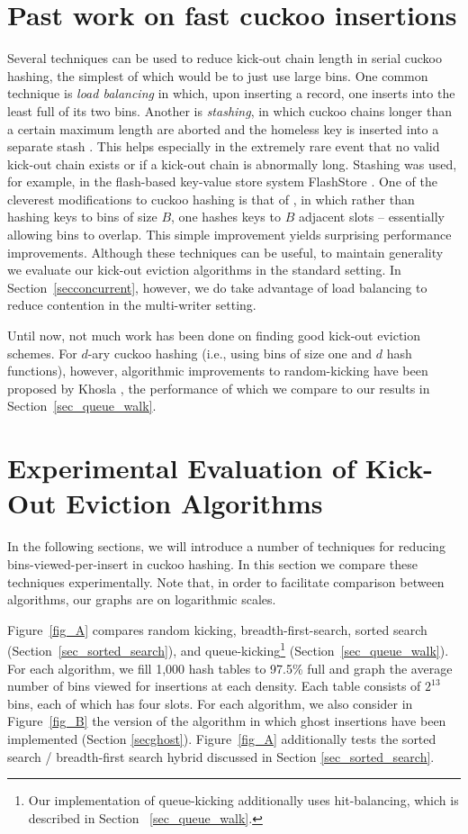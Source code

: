 \documentclass{sig-alternate-05-2015}
\begin{document}
\section{Past work on fast cuckoo insertions} \label{sec_past_work}

Several techniques can be used to reduce kick-out chain length in
serial cuckoo hashing, the simplest of which would be to just use
large bins. One common technique is \emph{load balancing} in which,
upon inserting a record, one inserts into the least full of its two
bins. Another is \emph{stashing}, in which cuckoo chains longer than a
certain maximum length are aborted and the homeless key is inserted
into a separate stash \cite{kirsch09}. This helps especially in the
extremely rare event that no valid kick-out chain exists or if a
kick-out chain is abnormally long. Stashing was used, for example, in
the flash-based key-value store system FlashStore \cite{flash10}. One
of the cleverest modifications to cuckoo hashing is that of
\cite{lehman09}, in which rather than hashing keys to bins of size
$B$, one hashes keys to $B$ adjacent slots -- essentially allowing
bins to overlap. This simple improvement yields surprising performance
improvements. Although these techniques can be useful, to maintain
generality we evaluate our kick-out eviction algorithms in the
standard setting. In Section~\ref{secconcurrent}, however, we do take
advantage of load balancing to reduce contention in the multi-writer
setting.


Until now, not much work has been done on finding good kick-out
eviction schemes.
For $d$-ary cuckoo hashing (i.e., using bins of size one and $d$ hash
functions), however, algorithmic improvements to random-kicking have
been proposed by Khosla \cite{khosla13}, the performance of which we
compare to our results in Section~\ref{sec_queue_walk}.

\section{Experimental Evaluation of Kick-Out Eviction Algorithms}\label{secexp}

In the following sections, we will introduce a number of techniques
for reducing bins-viewed-per-insert in cuckoo hashing. In this section
we compare these techniques experimentally. Note that, in order to
facilitate comparison between algorithms, our graphs are on
logarithmic scales.

Figure~\ref{fig_A} compares random kicking, breadth-first-search,
sorted search (Section~\ref{sec_sorted_search}), and
queue-kicking\footnote{Our implementation of queue-kicking
  additionally uses hit-balancing, which is described in Section
 ~\ref{sec_queue_walk}.} (Section~\ref{sec_queue_walk}). For each
algorithm, we fill 1,000 hash tables to 97.5\% full and graph the
average number of bins viewed for insertions at each density. Each
table consists of $2^{13}$ bins, each of which has four slots. For
each algorithm, we also consider in Figure~\ref{fig_B} the version of
the algorithm in which ghost insertions have been implemented (Section
\ref{secghost}). Figure~\ref{fig_A} additionally tests the sorted
search / breadth-first search hybrid discussed in Section
\ref{sec_sorted_search}.
\end{document}
